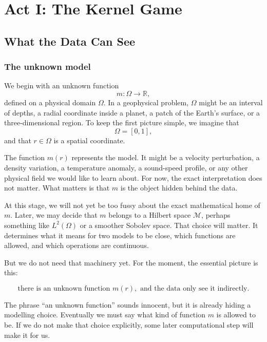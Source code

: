 \documentclass[11pt,openany]{book}
\theoremstyle{definition}
\theoremstyle{remark}
\newcommand{\M}{\mathcal M}
\begin{document}
\part{Act I: The Kernel Game}

\chapter{What the Data Can See}

\section{The unknown model}

We begin with an unknown function
\[
  m:\Omega\to\mathbb R,
\]
defined on a physical domain \(\Omega\). In a geophysical problem, \(\Omega\) might be an
interval of depths, a radial coordinate inside a planet, a patch of the Earth's surface, or a
three-dimensional region. To keep the first picture simple, we imagine that
\[
  \Omega=[0,1],
\]
and that \(r\in\Omega\) is a spatial coordinate.

The function \(m(r)\) represents the model. It might be a velocity perturbation, a density
variation, a temperature anomaly, a sound-speed profile, or any other physical field we would
like to learn about. For now, the exact interpretation does not matter. What matters is that
\(m\) is the object hidden behind the data.

At this stage, we will not yet be too fussy about the exact mathematical home of \(m\). Later,
we may decide that \(m\) belongs to a Hilbert space \(\M\), perhaps something like
\(L^2(\Omega)\) or a smoother Sobolev space. That choice will matter. It determines what it
means for two models to be close, which functions are allowed, and which operations are
continuous.

But we do not need that machinery yet. For the moment, the essential picture is this:

\[
  \text{there is an unknown function }m(r),\text{ and the data only see it indirectly.}
\]

\begin{warningbox}
The phrase ``an unknown function'' sounds innocent, but it is already hiding a modelling choice.
Eventually we must say what kind of function \(m\) is allowed to be. If we do not make that
choice explicitly, some later computational step will make it for us.
\end{warningbox}
\end{document}
